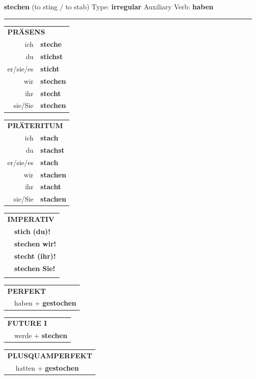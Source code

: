 \documentclass[10pt,a4paper]{revtex4-2}
\begin{document}
\begin{verbbox}
    {\Large \bf stechen} (to sting / to stab) \hfill Type: \textbf{irregular} \hfill Auxiliary Verb: \textbf{haben} 
    
     \vspace{5pt}

    \hrule
    
    \vspace{5pt}

  \begin{tabular}{rl}
     \multicolumn{2}{l}{\textbf{PRÄSENS} }\\
    ich & \textbf{steche}\\
    du & \textbf{stichst}\\
    er/sie/es & \textbf{sticht}\\
    wir & \textbf{stechen}\\
    ihr & \textbf{stecht}\\
    sie/Sie & \textbf{stechen}\\
  \end{tabular}
  \hfill
     \begin{tabular}{rl}
    \multicolumn{2}{l}{\textbf{PRÄTERITUM} }\\
    ich & \textbf{stach}\\
    du & \textbf{stachst}\\
    er/sie/es & \textbf{stach}\\
    wir & \textbf{stachen}\\
    ihr & \textbf{stacht}\\
    sie/Sie & \textbf{stachen}\\
  \end{tabular}
  \hfill
  \begin{tabular}{rl}
     \multicolumn{2}{l}{\textbf{IMPERATIV} }\\
   & \textbf{stich (du)!}\\
   & \textbf{stechen wir!}\\
   & \textbf{stecht (ihr)!}\\
   & \textbf{stechen Sie!}\\
   & \vspace{10pt}
  \end{tabular}

    \vspace{10pt}

 \begin{tabular}{rl}
     \multicolumn{2}{l}{\textbf{PERFEKT}}\\
   & haben + \textbf{gestochen}\\
  \end{tabular}
\hfill
   \begin{tabular}{rl}
    \multicolumn{2}{l}{\textbf{FUTURE I} }\\
   & werde + \textbf{stechen}\\
  \end{tabular}
\hfill
   \begin{tabular}{rl}
      \multicolumn{2}{l}{\textbf{PLUSQUAMPERFEKT}}\\
   & hatten + \textbf{gestochen}\\
  \end{tabular}


\end{verbbox}
\end{document}
